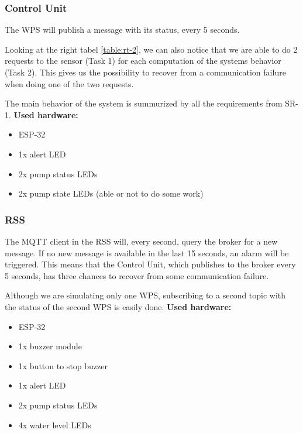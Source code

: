 \documentclass[11pt]{article}
\begin{document}
\subsubsection{Control Unit}

The WPS will publish a message with its status, every 5 seconds.

Looking at the right tabel \ref{table:rt-2}, we can also notice that we are able to do 2 requests to the sensor (Task 1) for each computation of the systems behavior (Task 2). This gives us the possibility to recover from a communication failure when doing one of the two requests.

The main behavior of the system is summurized by all the requirements from SR-1.
\newline
\newline
\noindent
\textbf{Used hardware:}
\begin{itemize}
	\item ESP-32
	\item 1x alert LED
	\item 2x pump status LEDs
	\item 2x pump state LEDs (able or not to do some work)
\end{itemize}

\subsubsection{RSS}

The MQTT client in the RSS will, every second, query the broker for a new message. If no new message is available in the last 15 seconds, an alarm will be triggered. This means that the Control Unit, which publishes to the broker every 5 seconds, has three chances to recover from some communication failure. 

Although we are simulating only one WPS, subscribing to a second topic with the status of the second WPS is easily done.
\newline
\newline
\noindent
\textbf{Used hardware:}
\begin{itemize}
	\item ESP-32
	\item 1x buzzer module
	\item 1x button to stop buzzer
	\item 1x alert LED
	\item 2x pump status LEDs
	\item 4x water level LEDs
\end{itemize}
\end{document}
